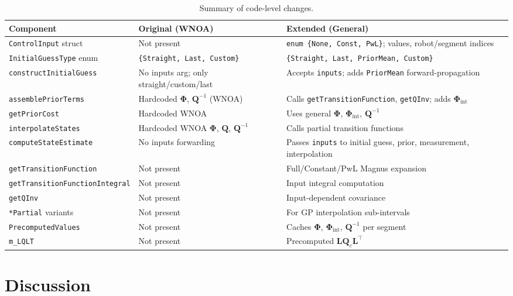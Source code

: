 \documentclass[11pt,a4paper]{article}
\newcommand{\inv}{^{-1}}
\newcommand{\bPhi}{\bm{\Phi}}
\newcommand{\bQ}{\mathbf{Q}}
\newcommand{\bL}{\mathbf{L}}
\begin{document}
\begin{table}[h]
\centering
\caption{Summary of code-level changes.}
\label{tab:changes}
\small
\begin{tabular}{@{}p{4.5cm}p{5.5cm}p{5.5cm}@{}}
\toprule
\textbf{Component} & \textbf{Original (WNOA)} & \textbf{Extended (General)} \\
\midrule
\texttt{ControlInput} struct & Not present & \texttt{enum \{None, Const, PwL\}}; values, robot/segment indices \\
\midrule
\texttt{InitialGuessType} enum & \texttt{\{Straight, Last, Custom\}} & \texttt{\{Straight, Last, PriorMean, Custom\}} \\
\midrule
\texttt{constructInitialGuess} & No inputs arg; only straight/custom/last & Accepts \texttt{inputs}; adds \texttt{PriorMean} forward-propagation \\
\midrule
\texttt{assemblePriorTerms} & Hardcoded $\bPhi$, $\bQ\inv$ (WNOA) & Calls \texttt{getTransitionFunction}, \texttt{getQInv}; adds $\bPhi_{\mathrm{int}}$ \\
\midrule
\texttt{getPriorCost} & Hardcoded WNOA & Uses general $\bPhi$, $\bPhi_{\mathrm{int}}$, $\bQ\inv$ \\
\midrule
\texttt{interpolateStates} & Hardcoded WNOA $\bPhi$, $\bQ$, $\bQ\inv$ & Calls partial transition functions \\
\midrule
\texttt{computeStateEstimate} & No inputs forwarding & Passes \texttt{inputs} to initial guess, prior, measurement, interpolation \\
\midrule
\texttt{getTransitionFunction} & Not present & Full/Constant/PwL Magnus expansion \\
\texttt{getTransitionFunctionIntegral} & Not present & Input integral computation \\
\texttt{getQInv} & Not present & Input-dependent covariance \\
\texttt{*Partial} variants & Not present & For GP interpolation sub-intervals \\
\midrule
\texttt{PrecomputedValues} & Not present & Caches $\bPhi$, $\bPhi_{\mathrm{int}}$, $\bQ\inv$ per segment \\
\texttt{m\_LQLT} & Not present & Precomputed $\bL\bQ_c\bL^\top$ \\
\bottomrule
\end{tabular}
\end{table}

\section{Discussion}
\label{sec:discussion}
\end{document}
